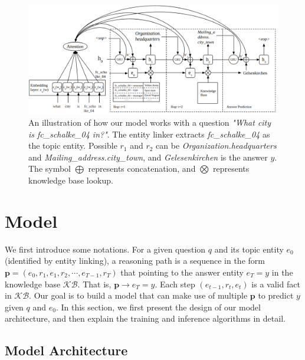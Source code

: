 \begin{figure}[t]
\includegraphics[width=2.1\columnwidth]{figs/model.png}
\caption{\fontsize{10}{12}\selectfont An illustration of how our model works with a question \textit{"What city is fc\_schalke\_04 in?"}. The entity linker extracts \textit{fc\_schalke\_04} as the topic entity. Possible $r_1$ and $r_2$ can be \textit{Organization.headquarters} and \textit{Mailing\_address.city\_town}, and \textit{Gelesenkirchen} is the answer $y$. The symbol $\bigoplus$ represents concatenation, and $\bigotimes$ represents knowledge base lookup. }
\label{fig:model}
\end{figure}


\section{Model}
We first introduce some notations. For a given question $q$ and its topic entity $e_0$ (identified by entity linking), a reasoning path is a sequence in the form $\mathbf{p} = (e_0, r_{1},e_{1},r_{2}, \cdots,e_{T-1}, r_{T})$ that pointing to the answer entity $e_T=y$ in the knowledge base $\mathcal{KB}$. That is, $\mathbf{p}\rightarrow e_T=y$. Each step $(e_{t-1},r_t,e_t)$ is a valid fact in $\mathcal{KB}$. Our goal is to build a model that can make use of multiple $\mathbf{p}$ to predict $y$ given $q$ and $e_0$. In this section, we first present the design of our model architecture, and then explain the training and inference algorithms in detail. 

\subsection{Model Architecture}





